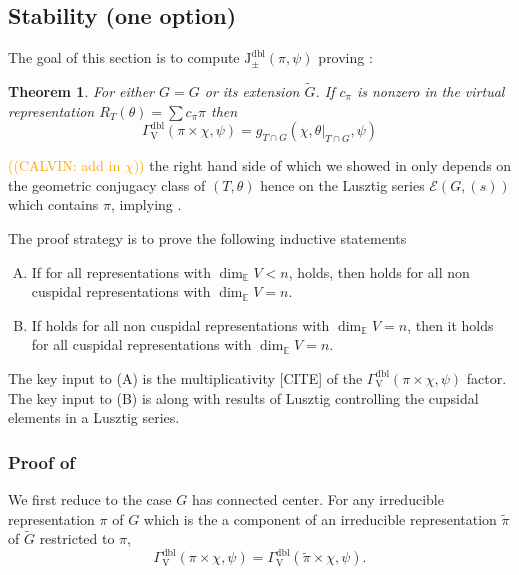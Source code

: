 \documentclass[12pt, reqno]{amsart}
\newtheorem{theorem}{Theorem}[section]
\theoremstyle{definition}
\theoremstyle{definition}
\theoremstyle{definition}
\newcommand{\hermitianSpace}{\mathrm{V}}
\newcommand{\fieldCharacter}{\psi}
\newcommand{\GroupExtension}[1]{\widetilde{#1}}
\newcommand{\dblJacobiSumScalar}[2]{\mathrm{J}_{\pm}^{\mathrm{dbl}}\left(#1, #2\right)}
\newcommand{\dblGammaFactorSpace}[4]{\Gamma^{\mathrm{dbl}}_{#1}\left(#2 \times #3, #4\right)}
\newcommand{\LusztigSeries}[2]{\mathcal{E}\left(#1, (#2)\right)}
\newcommand{\calvin}[1]{\textcolor{orange}{\sffamily ((CALVIN: #1))}}
\begin{document}
\subsection{Stability (one option)}\label{subsec:stability}
The goal of this section is to compute $\dblJacobiSumScalar{\pi}{\fieldCharacter}$ proving :
\begin{theorem}
\label{thm:doubling-method-gamma-factor-for-deligne-lusztig} For either $G=G$ or its extension $\GroupExtension{G}$. If $c_{\pi}$ is nonzero in the virtual representation $R_T(\theta) = \sum c_{\pi} \pi$ then
$$\dblGammaFactorSpace{\hermitianSpace}{\pi}{\chi}{\fieldCharacter} = g_{T \cap G}\left(\chi,\theta|_{T \cap G}, \fieldCharacter\right)$$
\end{theorem}
\calvin{add in $\chi$} the right hand side of which we showed in  only depends on the geometric conjugacy class of $(T,\theta)$ hence on the Lusztig series $\LusztigSeries{G}{s}$ which contains $\pi$, implying .

The proof strategy is to prove the following inductive statements
\begin{enumerate}[(A)]
	\item If for all representations with $\dim_{\mathbb{E}} V < n$,  holds, then  holds for all non cuspidal representations with $\dim_{\mathbb{E}} V = n$.
	\item If  holds for all non cuspidal representations with $\dim_{\mathbb{E}} V = n$, then it holds for all cuspidal representations with $\dim_{\mathbb{E}} V = n$.
\end{enumerate}
The key input to (A) is the multiplicativity [CITE] of the $\dblGammaFactorSpace{\hermitianSpace}{\pi}{\chi}{\fieldCharacter}$ factor. The key input to (B) is  along with results of Lusztig controlling the cupsidal elements in a Lusztig series.

\subsubsection{Proof of }
We first reduce  to the case $G$ has connected center. For any irreducible representation $\pi$ of $G$ which is the a component of an irreducible representation $\tilde{\pi}$ of $\GroupExtension{G}$ restricted to $\pi$,
\[
    \dblGammaFactorSpace{\hermitianSpace}{\pi}{\chi}{\fieldCharacter} = \dblGammaFactorSpace{\hermitianSpace}{\tilde{\pi}}{\chi}{\fieldCharacter}.
\]
\end{document}
